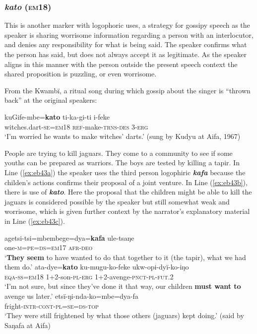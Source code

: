 \documentclass[output=paper]{langsci/langscibook}
\begin{document}
\subsubsection{\textit{kato} (\textsc{em}18)}  
This is another marker with logophoric uses, a strategy for gossipy speech as the speaker is sharing worrisome information regarding a  person with  an interlocutor,  and denies any responsibility for what is being said. The speaker confirms what the   person has said,  but does not always accept it as legitimate.  As the speaker aligns in this manner with the  person outside the present speech context the shared proposition is puzzling, or even worrisome.

From the Kwambï,  a ritual song during which gossip about the singer is ``thrown back'' at the original speakers:

\begin{exe}
	\ex \label{ex:eb42}
	\gll kuGife-mbe=\textbf{kato} ti-ka-gi-ti i-feke\\
	witches.dart-\textsc{se}=\textsc{em18} \textsc{ref}-make-\textsc{trns-des} 3-\textsc{erg}\\
	\trans `I'm worried he wants to make witches' darts.' (sung by Kudyu at Aifa, 1967)
\end{exe}

People are trying to kill jaguars. They come to a community to see if some youths can be prepared as warriors. The boys are tested by killing a tapir. In Line (\ref{ex:eb43a}) the speaker uses the third person logophiric \textbf{\textit{kafa}} because the childen’s actions confirms their proposal of a joint venture.  In Line (\ref{ex:eb43b}), there is use of \textbf{\textit{kato}}. Here the proposal that the children might be able to kill the jaguars is considered possible by the speaker but still somewhat weak and worrisome, which is given further context by the narrator’s explanatory material in Line (\ref{ex:eb43c}).

\begin{exe}
\ex \label{ex:eb43}
	\begin{xlist}
	\ex \label{ex:eb43a}
	\gll agetsi-tsi=mbembege=dya=\textbf{kafa} ule-tsaŋe\\
	one-\textsc{m=pe=ds=em17} \textsc{afr-deo}\\
	\trans ‘\textbf{They seem} to have wanted to do that together to it (the tapir),  what  we had them do.’
	\ex \label{ex:eb43b}
	\gll ata-dye=\textbf{kato} ku-mugu-ko-feke ukw-opi-dyï-ko-iŋo\\
	\textsc{eqa-ss=em18} 1+2-son-\textsc{pl-erg} 1+2-avenge-\textsc{pnct-pl-fut.2}\\
	\trans ‘I’m not sure, but since they’ve done it that way,  our children \textbf{must want to} avenge us later.’
	\ex \label{ex:eb43c}
	\gll etsï-ŋi-nda-ko=mbe=dya-fa\\
	fright-\textsc{intr-cont-pl=se=ds-top}\\
	\trans ‘They were still frightened by what those others (jaguars) kept doing.’ (said by Saŋafa  at Aifa)
\end{xlist}
\end{exe}
\end{document}
